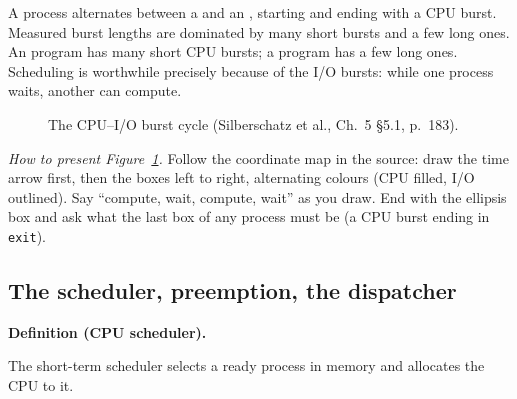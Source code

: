\documentclass[11pt]{article}
\newenvironment{definitionbox}[1]{%
  \par\noindent\textbf{Definition (#1).}\ \itshape
}{\par\vspace{0.3em}}
\begin{document}
A process alternates between a  and an , starting and ending with a CPU burst. Measured burst lengths are dominated by many short bursts and a few long ones. An  program has many short CPU bursts; a  program has a few long ones. Scheduling is worthwhile precisely because of the I/O bursts: while one process waits, another can compute.

\begin{figure}[h]
\centering
{}
\caption{The CPU--I/O burst cycle (Silberschatz et al., Ch.~5 \S5.1, p.~183).}
\label{fig:burst}
\end{figure}

\emph{How to present Figure~\ref{fig:burst}.} Follow the coordinate map in the source: draw the time arrow first, then the boxes left to right, alternating colours (CPU filled, I/O outlined). Say ``compute, wait, compute, wait'' as you draw. End with the ellipsis box and ask what the last box of any process must be (a CPU burst ending in \texttt{exit}).

\subsection*{The scheduler, preemption, the dispatcher}

\begin{definitionbox}{CPU scheduler}
The short-term scheduler selects a ready process in memory and allocates the CPU to it.
\end{definitionbox}
\end{document}
